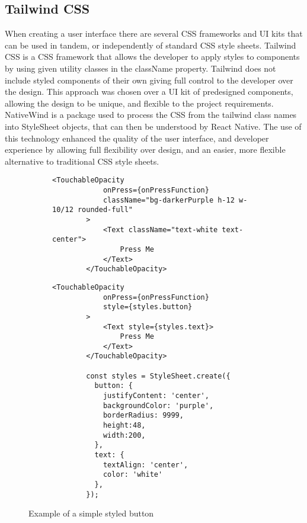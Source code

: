 \subsection{Tailwind CSS}
When creating a user interface there are several CSS frameworks and UI kits that can be used in tandem, or independently of standard CSS style sheets. Tailwind CSS \cite{tailwind} is a CSS framework that allows the developer to apply styles to components by using given utility classes in the className property. Tailwind does not include styled components of their own giving full control to the developer over the design. This approach was chosen over a UI kit of predesigned components, allowing the design to be unique, and flexible to the project requirements. NativeWind \cite{nativewind} is a package used to process the CSS from the tailwind class names into StyleSheet objects, that can then be understood by React Native. The use of this technology enhanced the quality of the user interface, and developer experience by allowing full flexibility over design, and an easier, more flexible alternative to traditional CSS style sheets.
\begin{figure}[!htbp]
    \centering
    \begin{subfigure}[b]{0.42\textwidth}
        \begin{lstlisting}[language=jsJsx, caption={Styled using Tailwind CSS}]
        <TouchableOpacity
            onPress={onPressFunction}
            className="bg-darkerPurple h-12 w-10/12 rounded-full"
        >
            <Text className="text-white text-center">
                Press Me
            </Text>
        </TouchableOpacity>
        \end{lstlisting}
    \end{subfigure}
    \hspace{2em}
    \begin{subfigure}[b]{0.45\textwidth}
        \begin{lstlisting}[language=jsJsx, caption={Styled using a traditional StyleSheet}]
        <TouchableOpacity
            onPress={onPressFunction}
            style={styles.button}
        >
            <Text style={styles.text}>
                Press Me
            </Text>
        </TouchableOpacity>
            
        const styles = StyleSheet.create({
          button: {
            justifyContent: 'center',
            backgroundColor: 'purple',
            borderRadius: 9999,
            height:48,
            width:200,
          },
          text: {
            textAlign: 'center',
            color: 'white'
          },
        });
        \end{lstlisting}
    \end{subfigure}
    \caption{Example of a simple styled button}
    \label{fig:tailwind}
\end{figure}
\FloatBarrier
